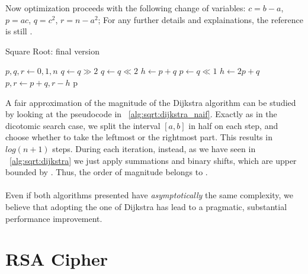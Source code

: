 Now optimization proceeds with the following change of variables:
$c = b-a$,
$p = ac$,
$q = c^2$,
$r = n-a^2$;
For any further details and explainations, the reference is still
\cite{Dijkstra:adop}.

\begin{algorithm}[H]
  \caption{Square Root: final version}
  \label{alg:sqrt:dijkstra}
  \begin{algorithmic}[1]
    \State $p, q, r \gets 0, 1, n$
     $q \gets q \gg 2$ \EndWhile
      \State $q \gets q \ll 2$
      \State $h \gets p+q$
      \State $p \gets q \ll 1$
      \State $h \gets 2p + q$
       $p, r \gets p+q, r-h$ \EndIf
    \EndWhile
    \State \Return p
  \end{algorithmic}
\end{algorithm}

A fair approximation of the magnitude of the Dijkstra algorithm can be studied
by looking at the pseudocode in ~\ref{alg:sqrt:dijkstra_naif}. Exactly as in
the dicotomic search case, we split the interval $[a, b]$ in half on each step,
and choose whether to take the leftmost or the rightmost part. This results in
$log(n+1)$ steps. During each iteration, instead, as we have seen in
~\ref{alg:sqrt:dijkstra} we just apply summations and binary shifts, which are
upper bounded by . Thus, the order of magnitude belongs to
.

\paragraph{}
Even if both algorithms presented have \emph{asymptotically} the same
complexity, we believe that adopting the one of Dijkstra has lead to a
pragmatic, substantial performance improvement.


\section{RSA Cipher \label{sec:preq:rsa}}

